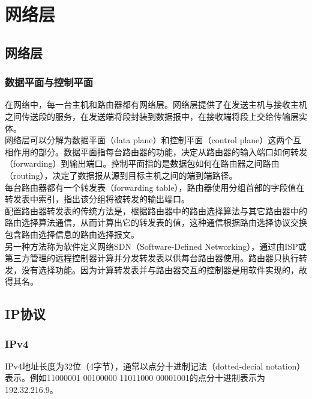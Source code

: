 \chapter{网络层}

\section{网络层}

\subsection{数据平面与控制平面}

在网络中，每一台主机和路由器都有网络层。网络层提供了在发送主机与接收主机之间传送段的服务，在发送端将段封装到数据报中，在接收端将段上交给传输层实体。\\

网络层可以分解为数据平面（data plane）和控制平面（control plane）这两个互相作用的部分。数据平面指每台路由器的功能，决定从路由器的输入端口如何转发（forwarding）到输出端口。控制平面指的是数据包如何在路由器之间路由（routing），决定了数据报从源到目标主机之间的端到端路径。\\

每台路由器都有一个转发表（forwarding table），路由器使用分组首部的字段值在转发表中索引，指出该分组将被转发的输出端口。\\

配置路由器转发表的传统方法是，根据路由器中的路由选择算法与其它路由器中的路由选择算法通信，从而计算出它的转发表的值，这种通信根据路由选择协议交换包含路由选择信息的路由选择报文。\\

另一种方法称为软件定义网络SDN（Software-Defined Networking），通过由ISP或第三方管理的远程控制器计算并分发转发表以供每台路由器使用。路由器只执行转发，没有选择功能。因为计算转发表并与路由器交互的控制器是用软件实现的，故得其名。

\newpage

\section{IP协议}

\subsection{IPv4}

IPv4地址长度为32位（4字节），通常以点分十进制记法（dotted-decial notation）表示。例如11000001 00100000 11011000 00001001的点分十进制表示为192.32.216.9。\\

